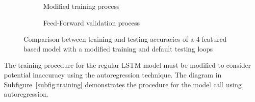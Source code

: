  {
\begin{figure}[htbp]
    \centering
    \begin{subfigure}[b]{\columnwidth}
        \centering
        
        \caption{Modified training process}
    \end{subfigure}
    \begin{subfigure}[b]{\columnwidth}
        \centering
        
        \caption{Feed-Forward validation process}
    \end{subfigure}
    \caption{Comparison between training and testing accuracies of a 4-featured based model with a modified training and default testing loops}
    \label{fig:modefied_tr}
\end{figure}
}
%
%
The training procedure for the regular LSTM model must be modified to consider potential inaccuracy using the autoregression technique.
The diagram in \mbox{Subfigure~\ref{subfig:training}} demonstrates the procedure for the model call using autoregression.
